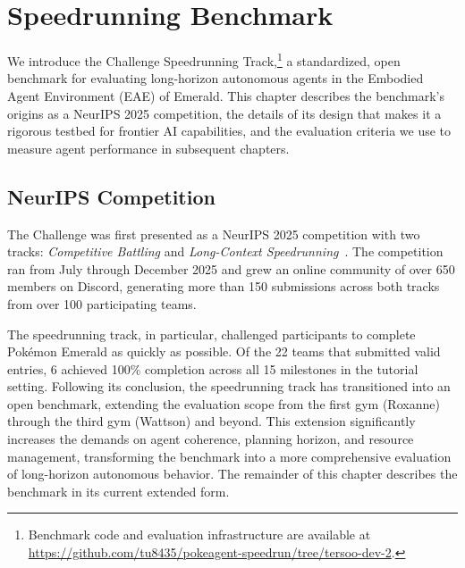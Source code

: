
\newpage
\section{Speedrunning Benchmark}\label{sec:benchmark}

We introduce the \pokeagent{} Challenge Speedrunning Track,\footnote{Benchmark code and evaluation infrastructure are available at \url{https://github.com/tu8435/pokeagent-speedrun/tree/tersoo-dev-2}.} a standardized, open benchmark for evaluating long-horizon autonomous agents in the Embodied Agent Environment (EAE) of \pokemon{} Emerald. This chapter describes the benchmark's origins as a NeurIPS 2025 competition, the details of its design that makes it a rigorous testbed for frontier AI capabilities, and the evaluation criteria we use to measure agent performance in subsequent chapters.

\subsection{NeurIPS Competition}\label{sec:neurips_background}

The \pokeagent{} Challenge was first presented as a NeurIPS 2025 competition with two tracks: \emph{Competitive Battling} and \emph{Long-Context Speedrunning}~\citep{karten2025pokeagent}. The competition ran from July through December 2025 and grew an online community of over 650 members on Discord, generating more than 150 submissions across both tracks from over 100 participating teams. 

The speedrunning track, in particular, challenged participants to complete Pok\'{e}mon Emerald as quickly as possible. Of the 22 teams that submitted valid entries, 6 achieved 100\% completion across all 15 milestones in the tutorial setting. Following its conclusion, the speedrunning track has transitioned into an open benchmark, extending the evaluation scope from the first gym (Roxanne) through the third gym (Wattson) and beyond. This extension significantly increases the demands on agent coherence, planning horizon, and resource management, transforming the benchmark into a more comprehensive evaluation of long-horizon autonomous behavior. The remainder of this chapter describes the benchmark in its current extended form.

